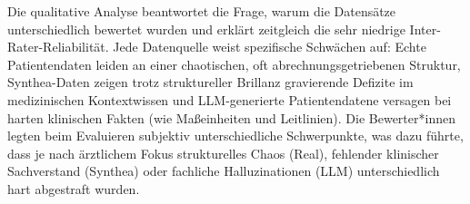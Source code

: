 \begin{description}[style=nextline, font=\bfseries]
\item[Beantwortung] Die qualitative Analyse beantwortet die Frage, warum die Datensätze unterschiedlich bewertet wurden und erklärt zeitgleich die sehr niedrige Inter-Rater-Reliabilität. Jede Datenquelle weist spezifische Schwächen auf: Echte Patientendaten leiden an einer chaotischen, oft abrechnungsgetriebenen Struktur, Synthea-Daten zeigen trotz struktureller Brillanz gravierende Defizite im medizinischen Kontextwissen und LLM-generierte Patientendatene versagen bei harten klinischen Fakten (wie Maßeinheiten und Leitlinien). Die Bewerter*innen legten beim Evaluieren subjektiv unterschiedliche Schwerpunkte, was dazu führte, dass je nach ärztlichem Fokus strukturelles Chaos (Real), fehlender klinischer Sachverstand (Synthea) oder fachliche Halluzinationen (LLM) unterschiedlich hart abgestraft wurden.
\end{description}


